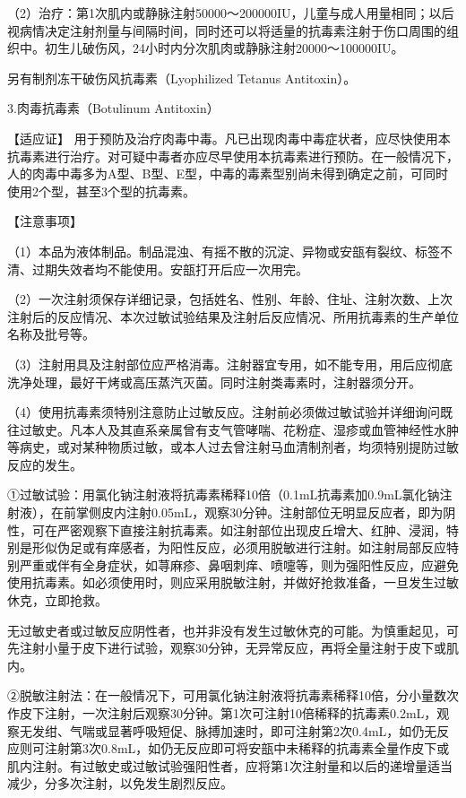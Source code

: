 （2）治疗：第1次肌内或静脉注射50000～200000IU，儿童与成人用量相同；以后视病情决定注射剂量与间隔时间，同时还可以将适量的抗毒素注射于伤口周围的组织中。初生儿破伤风，24小时内分次肌肉或静脉注射20000～100000IU。

另有制剂冻干破伤风抗毒素（Lyophilized Tetanus Antitoxin）。

3.肉毒抗毒素（Botulinum Antitoxin）

【适应证】
用于预防及治疗肉毒中毒。凡已出现肉毒中毒症状者，应尽快使用本抗毒素进行治疗。对可疑中毒者亦应尽早使用本抗毒素进行预防。在一般情况下，人的肉毒中毒多为A型、B型、E型，中毒的毒素型别尚未得到确定之前，可同时使用2个型，甚至3个型的抗毒素。

【注意事项】

（1）本品为液体制品。制品混浊、有摇不散的沉淀、异物或安瓿有裂纹、标签不清、过期失效者均不能使用。安瓿打开后应一次用完。

（2）一次注射须保存详细记录，包括姓名、性别、年龄、住址、注射次数、上次注射后的反应情况、本次过敏试验结果及注射后反应情况、所用抗毒素的生产单位名称及批号等。

（3）注射用具及注射部位应严格消毒。注射器宜专用，如不能专用，用后应彻底洗净处理，最好干烤或高压蒸汽灭菌。同时注射类毒素时，注射器须分开。

（4）使用抗毒素须特别注意防止过敏反应。注射前必须做过敏试验并详细询问既往过敏史。凡本人及其直系亲属曾有支气管哮喘、花粉症、湿疹或血管神经性水肿等病史，或对某种物质过敏，或本人过去曾注射马血清制剂者，均须特别提防过敏反应的发生。

①过敏试验：用氯化钠注射液将抗毒素稀释10倍（0.1mL抗毒素加0.9mL氯化钠注射液），在前掌侧皮内注射0.05mL，观察30分钟。注射部位无明显反应者，即为阴性，可在严密观察下直接注射抗毒素。如注射部位出现皮丘增大、红肿、浸润，特别是形似伪足或有痒感者，为阳性反应，必须用脱敏进行注射。如注射局部反应特别严重或伴有全身症状，如荨麻疹、鼻咽刺痒、喷嚏等，则为强阳性反应，应避免使用抗毒素。如必须使用时，则应采用脱敏注射，并做好抢救准备，一旦发生过敏休克，立即抢救。

无过敏史者或过敏反应阴性者，也并非没有发生过敏休克的可能。为慎重起见，可先注射小量于皮下进行试验，观察30分钟，无异常反应，再将全量注射于皮下或肌内。

②脱敏注射法：在一般情况下，可用氯化钠注射液将抗毒素稀释10倍，分小量数次作皮下注射，一次注射后观察30分钟。第1次可注射10倍稀释的抗毒素0.2mL，观察无发绀、气喘或显著呼吸短促、脉搏加速时，即可注射第2次0.4mL，如仍无反应则可注射第3次0.8mL，如仍无反应即可将安瓿中未稀释的抗毒素全量作皮下或肌内注射。有过敏史或过敏试验强阳性者，应将第1次注射量和以后的递增量适当减少，分多次注射，以免发生剧烈反应。

